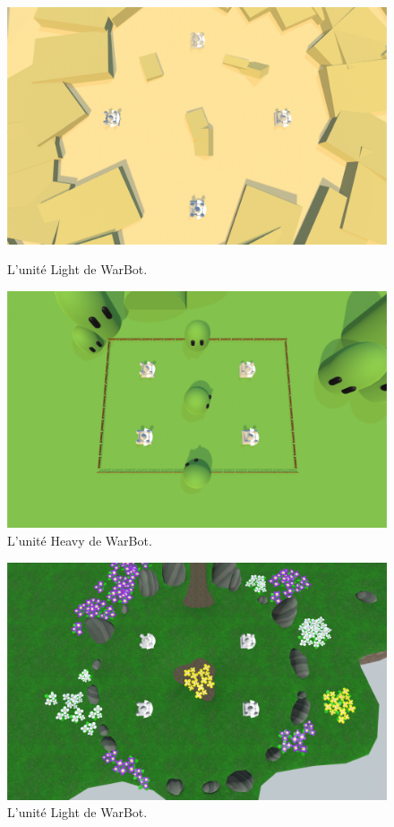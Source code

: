 \documentclass{report}
\begin{document}
\begin{figure}[h]
    \begin{minipage}[c]{.46\linewidth}
        \centering
	\includegraphics[scale=0.25]{MapDesolateImage}
	\caption{L'unité Light de WarBot.}
    \end{minipage}
    \hfill%
    \begin{minipage}[c]{.46\linewidth}
        \centering
	\includegraphics[scale=0.25]{MapPlainImage}
	\caption{L'unité Heavy de WarBot.}
    \end{minipage}
\end{figure}
\begin{figure}[!h]
        \centering
		\includegraphics[scale=0.5]{MapGardenImage}
	\caption{L'unité Light de WarBot.}
\end{figure}
\newpage
\newpage
\newpage
\newpage
\end{document}
